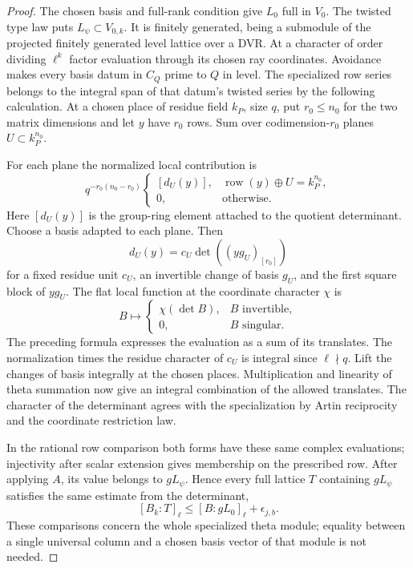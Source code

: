 \begin{proof}
The chosen basis and full-rank
condition give \(L_0\) full in \(V_0\). The twisted type law puts \(L_\psi\subset V_{0,k}\). It is finitely generated, being a submodule of the projected finitely generated level lattice over a DVR. At a character of order dividing \(\ell^k\)
factor evaluation through its chosen ray coordinates. Avoidance makes every basis datum in \(C_Q\) prime to \(Q\) in level. The specialized row series belongs to the integral span of that datum's twisted series by the following calculation. At a chosen place of residue
field \(k_P\), size \(q\), put \(r_0\le n_0\) for the two
matrix dimensions and let \(y\) have \(r_0\) rows. Sum over
codimension-\(r_0\) planes \(U\subset k_P^{n_0}\).

For each plane the normalized local contribution is
\[
 q^{-r_0(n_0-r_0)}\begin{cases}[d_U(y)],&\operatorname{row}(y)\oplus U=k_P^{n_0},\\ 0,&\text{otherwise}.\end{cases}
\]
Here \([d_U(y)]\) is the group-ring element attached to the quotient determinant. Choose a basis adapted
to each plane. Then
\[
 d_U(y)=c_U\det((yg_U)_{[r_0]})
\]
for a fixed residue unit \(c_U\), an invertible change of
basis \(g_U\), and the first square block of \(yg_U\).
The flat local function at the coordinate character \(\chi\) is
\[
 B\longmapsto\begin{cases}\chi(\det B),& B\text{ invertible},\\
 0,& B\text{ singular}.
 \end{cases}
\]
The preceding formula expresses the evaluation as a sum of its translates. The normalization times the residue character of \(c_U\) is integral since \(\ell\nmid q\). Lift the changes of basis integrally at the chosen places. Multiplication and linearity of theta summation now give an integral combination of the allowed translates. The character of the determinant
agrees with the specialization by Artin reciprocity and the
coordinate restriction law.

In the rational row comparison
both forms have these same complex evaluations; injectivity
after scalar extension gives membership on the prescribed
row. After applying \(A\),
its value belongs to \(g L_\psi\). Hence every full lattice
\(T\) containing \(g L_\psi\) satisfies the same estimate
from the determinant,
\[
           [B_k:T]_\ell\le [B:gL_0]_\ell+\epsilon_{j,b}.
\]
These comparisons concern the whole specialized theta
module; equality between a single universal column and a
chosen basis vector of that module is not needed.


\end{proof}
